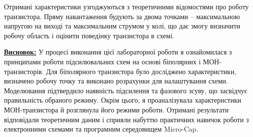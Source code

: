 \documentclass[12pt,a4paper]{article}
\begin{document}
    Отримані характеристики узгоджуються з теоретичними відомостями про роботу транзистора.
    Пряму навантаження будують за двома точками -- максимальною напругою на виході та максимальним струмом у колі, що дає змогу визначити робочу область і оцінити поведінку транзистора в схемі.

    \vspace{1em}

    \setlength{\parindent}{0em}

    \textbf{\underline{Висновок:}} У процесі виконання цієї лабораторної роботи я ознайомилася з принципами роботи
    підсилювальних схем на основі біполярних і МОН-транзисторів. Для біполярного транзистора було досліджено характеристики,
    визначено робочу точку та виконано розрахунки для налаштування схеми. Моделювання підтвердило наявність підсилення
    та фазового зсуву, що засвідчує правильність обраного режиму. Окрім цього, я проаналізувала характеристики МОН-транзистора
    й розглянула його режими роботи. Отримані результати відповідали теоретичним даним і сприяли набуттю практичних навичок
    роботи з електронними схемами та програмним середовищем Micro-Cap.
\end{document}
